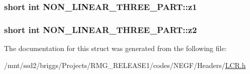 \hypertarget{struct_n_o_n___l_i_n_e_a_r___t_h_r_e_e___p_a_r_t_a2b503fe71f5ca57b33c16a0d6fe81a3d}{
\subsubsection[{z1}]{\setlength{\rightskip}{0pt plus 5cm}short int N\-O\-N\-\_\-\-L\-I\-N\-E\-A\-R\-\_\-\-T\-H\-R\-E\-E\-\_\-\-P\-A\-R\-T\-::z1}}\label{struct_n_o_n___l_i_n_e_a_r___t_h_r_e_e___p_a_r_t_a2b503fe71f5ca57b33c16a0d6fe81a3d}
\hypertarget{struct_n_o_n___l_i_n_e_a_r___t_h_r_e_e___p_a_r_t_aa6e32f9eaad5920d7dfb6826f9a79366}{
\subsubsection[{z2}]{\setlength{\rightskip}{0pt plus 5cm}short int N\-O\-N\-\_\-\-L\-I\-N\-E\-A\-R\-\_\-\-T\-H\-R\-E\-E\-\_\-\-P\-A\-R\-T\-::z2}}\label{struct_n_o_n___l_i_n_e_a_r___t_h_r_e_e___p_a_r_t_aa6e32f9eaad5920d7dfb6826f9a79366}


The documentation for this struct was generated from the following file\-:\begin{DoxyCompactItemize}
\item 
/mnt/ssd2/briggs/\-Projects/\-R\-M\-G\-\_\-\-R\-E\-L\-E\-A\-S\-E1/codes/\-N\-E\-G\-F/\-Headers/\hyperlink{_l_c_r_8h}{L\-C\-R.\-h}\end{DoxyCompactItemize}
